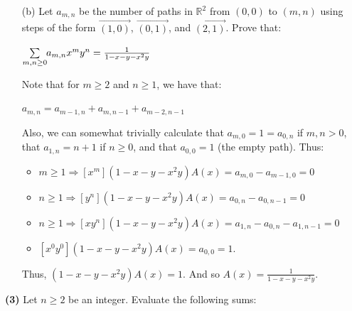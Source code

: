 \documentclass{book}
\newcommand{\exOne}{%
   \color{Purple}%
   \fontsize{13}{15}\selectfont%
}
\newenvironment{myIndent}{%
   \begin{adjustwidth}{2.5em}{0em}%
}{%
   \end{adjustwidth}%
}
\newcommand{\blab}[1]{\textbf{#1}}
\newcommand{\retTwo}{\hfill\bigbreak}
\begin{document}
\begin{enumerate}
   \item[(b)] Let $a_{m,n}$ be the number of paths in $\mathbb{R}^2$ from $(0, 0)$ to $(m, n)$ using steps of the form $\overrightarrow{(1, 0)}$, $\overrightarrow{(0, 1)}$, and $\overrightarrow{(2, 1)}$. Prove that:
   
   {\centering $\sum\limits_{m,n\geq 0}\hspace{-0.25em}a_{m,n}x^my^n = \frac{1}{1-x-y-x^2y}$ \retTwo\par}

   
   \begin{myIndent}\exOne
      Note that for $m \geq 2$ and $n \geq 1$, we have that:
      
      {\centering $a_{m,n} = a_{m-1, n} + a_{m, n-1} + a_{m-2, n-1} $ \retTwo\par}
   
      Also, we can somewhat trivially calculate that $a_{m, 0} = 1 = a_{0, n}$ if $m, n > 0$, that $a_{1, n} = n+1$ if $n \geq 0$, and that $a_{0,0} = 1$ (the empty path). Thus:
      \begin{itemize}
         \item $m \geq 1 \Longrightarrow [x^m](1 - x - y - x^2y)A(x) = a_{m,0} - a_{m-1, 0} = 0$
         \item $n \geq 1 \Longrightarrow [y^n](1 - x - y - x^2y)A(x) = a_{0,n} - a_{0, {n-1}} = 0$
         \item $n \geq 1 \Longrightarrow [xy^n](1 - x - y - x^2y)A(x) = a_{1, n} - a_{0, n} - a_{1, n-1} = 0$\newpage
         \item $[x^0y^0](1 - x - y - x^2y)A(x) = a_{0,0} = 1$.
      \end{itemize}

      Thus,  $(1 - x - y - x^2y)A(x) = 1$. And so $A(x) = \frac{1}{1 - x - y - x^2y}$.\retTwo
   \end{myIndent}
\end{enumerate}

\blab{(3)} Let $n \geq 2$ be an integer. Evaluate the following sums:
\end{document}
